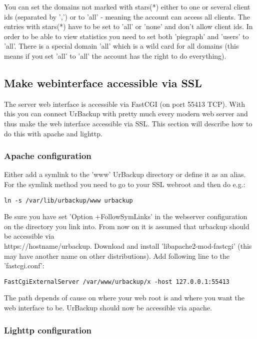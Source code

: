 \documentclass[a4paper,10pt]{article}
\begin{document}
You can set the domains not marked with stars(*) either to one or several client ids (separated by ',') or to 'all' - meaning the account can access all clients. The entries with stars(*) have to be set to 'all' or 'none' and don't allow client ids. In order to be able to view statistics you need to set both 'piegraph' and 'users' to 'all'. There is a special domain 'all' which is a wild card for all domains (this means if you set 'all' to 'all' the account has the right to do everything). 

\subsection{Make webinterface accessible via SSL}
\label{sec_webinterface_ssl}

The server web interface is accessible via FastCGI (on port 55413 TCP). With this you can connect UrBackup with pretty much every modern web server and thus make the web interface accessible via SSL. This section will describe how to do this with apache and lighttp.

\subsubsection{Apache configuration}
\label{subsub_apache}

Either add a symlink to the 'www' UrBackup directory or define it as an alias. For the symlink method you need to go to your SSL webroot and then do e.g.:
\begin{verbatim}
ln -s /var/lib/urbackup/www urbackup
\end{verbatim}
Be sure you have set 'Option +FollowSymLinks' in the webserver configuration on the directory you link into. From now on it is assumed that urbackup should be accessible via\\ https://hostname/urbackup.
Download and install 'libapache2-mod-fastcgi' (this may have another name on other distributions). Add following line to the 'fastcgi.conf':
\begin{verbatim}
FastCgiExternalServer /var/www/urbackup/x -host 127.0.0.1:55413
\end{verbatim}
The path depends of cause on where your web root is and where you want the web interface to be. UrBackup should now be accessible via apache.

\subsubsection{Lighttp configuration}
\end{document}
